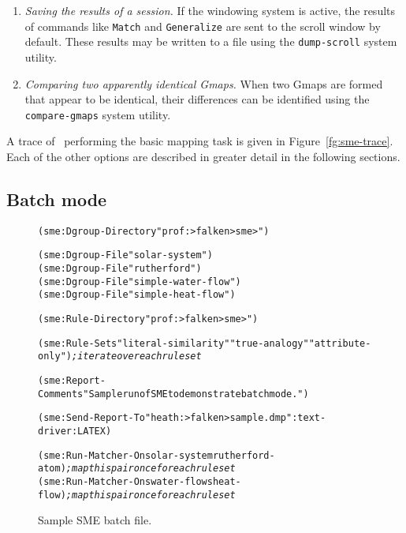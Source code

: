 \begin{enumerate}
\item {\it Saving the results of a session.} If the windowing system is
active, the results of commands like {\tt Match} and {\tt Generalize} are
sent to the scroll window by default. These results may be written to a file
using the {\tt dump-scroll} system utility.

\item {\it Comparing two apparently identical Gmaps.} When two Gmaps are
formed that appear to be identical, their differences can be identified
using the {\tt compare-gmaps} system utility.

\end{enumerate}

\noindent
A trace of \SME\ performing the basic mapping task is given in
Figure~\ref{fg:sme-trace}. Each of the other options are described in
greater detail in the following sections.


\subsection{Batch mode}

\indent
{}


\begin{figure}
\border
\begin{footnotesize}
\begin{alltt}
(sme:Dgroup-Directory "prof:>falken>sme>")

(sme:Dgroup-File "solar-system")
(sme:Dgroup-File "rutherford")
(sme:Dgroup-File "simple-water-flow")
(sme:Dgroup-File "simple-heat-flow")

(sme:Rule-Directory "prof:>falken>sme>")

(sme:Rule-Sets "literal-similarity" "true-analogy" "attribute-only")   {\it; iterate over each rule set}

(sme:Report-Comments "Sample run of SME to demonstrate batch mode.")

(sme:Send-Report-To "heath:>falken>sample.dmp" :text-driver :LATEX)

(sme:Run-Matcher-On solar-system rutherford-atom)                 {\it; map this pair once for each rule set}
(sme:Run-Matcher-On swater-flow sheat-flow)                       {\it; map this pair once for each rule set}
\end{alltt}
\end{footnotesize}
  \caption{Sample SME batch file.}
  \label{fg:batch-file}
\border
\end{figure}


